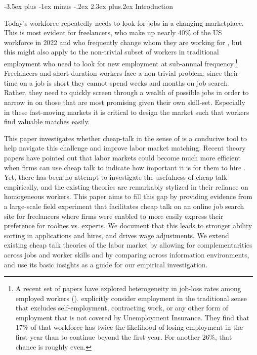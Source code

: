 \documentclass[12pt]{article}
\makeatletter
\renewcommand{\section}{%
  \@startsection{section}{1}{\z@}%
  {-3.5ex plus -1ex minus -.2ex}%
  {2.3ex plus.2ex}%
  {\normalfont\Large\bfseries}%
}
\makeatother
\begin{document}

\onehalfspacing

\section{Introduction}

 Today's workforce repeatedly needs to look for jobs in a changing marketplace. This is most evident for freelancers, who make up nearly 40\% of the US workforce in 2022 and who frequently change whom they are working for \citep{Bloomberg2022}, but this might also apply to the non-trivial subset of workers in traditional employment who need to look for new employment at sub-annual frequency.\footnote{A recent set of papers have explored heterogeneity in job-loss rates among employed workers (\cite{hall2022unemployed,ahn2023dual,gregory2021alpha}). \cite{gregory2021alpha} explicitly consider employment in the traditional sense that excludes self-employment, contracting work, or any other form of employment that
is not covered by Unemployment Insurance. They find that 17\% of that workforce has twice the likelihood of losing employment in the first year than to continue beyond the first year. For another 26\%, that chance is roughly even.} Freelancers and short-duration workers face a non-trivial problem: since their time on a job is short they cannot spend weeks and months on job search. Rather, they need to quickly screen through a wealth of possible jobs in order to narrow in on those that are most promising given their own skill-set. Especially in these fast-moving markets it is critical to design the market such that workers find valuable matches easily. 


 
 This paper investigates whether cheap-talk in the sense of \cite{crawford1982strategic} is a conducive tool to help navigate this challenge and improve labor market matching. Recent theory papers have pointed out that labor markets could become much more efficient when firms can use cheap talk to indicate how important it is for them to hire \citep{menzio2007theory, kimKircher2015}. Yet, there has been no attempt to investigate the usefulness of cheap-talk empirically, and the existing theories are remarkably stylized in their reliance on homogeneous workers. This paper aims to fill this gap by providing evidence from a large-scale field experiment that facilitates cheap talk on an online job search site for freelancers where firms were enabled to more easily express their preference for rookies vs. experts. We document that this leads to stronger ability sorting in applications and hires, and drives wage adjustments. We extend existing cheap talk theories of the labor market by allowing for complementarities across jobs and worker skills and by comparing across information environments, and use its basic insights as a guide for our empirical investigation. 
 
\end{document}
